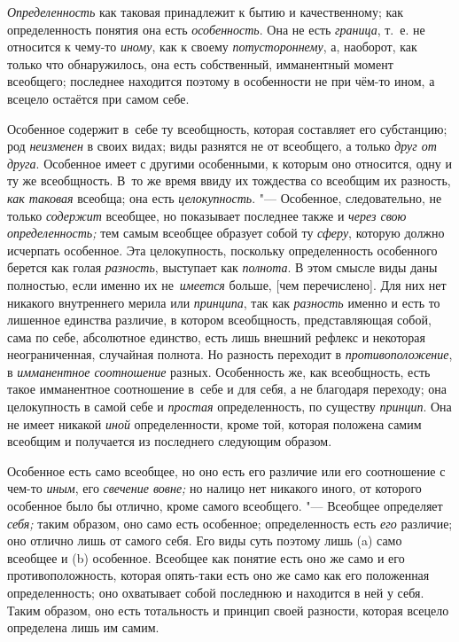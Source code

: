 {\em Определенность} как таковая принадлежит к бытию и качественному; как
определенность понятия она есть {\em особенность}. Она не есть {\em граница},
т.~е. не относится к чему-то {\em иному}, как к своему {\em потустороннему}, а,
наоборот, как только что обнаружилось, она есть собственный, имманентный момент
всеобщего; последнее находится поэтому в особенности не при чём-то ином, а
всецело остаётся при самом себе.

Особенное содержит в~себе ту всеобщность, которая составляет его субстанцию;
род {\em неизменен} в своих видах; виды разнятся не от всеобщего, а только
{\em друг от друга}. Особенное имеет с другими особенными, к которым оно
относится, одну и ту же всеобщность. В~то же время ввиду их тождества со
всеобщим их разность,
{\em как таковая} всеобща; она есть {\em целокупность}. "--- Особенное,
следовательно, не только {\em содержит} всеобщее, но показывает последнее
также и {\em через свою определенность;} тем самым всеобщее образует собой
ту {\em сферу}, которую должно исчерпать особенное. Эта целокупность, поскольку
определенность особенного берется как голая {\em разность}, выступает как
{\em полнота}. В этом смысле виды даны полностью, если именно их
не~{\em имеется} больше, [чем перечислено]. Для них нет никакого внутреннего
мерила или {\em принципа}, так как {\em разность} именно и есть то лишенное
единства различие, в котором всеобщность, представляющая собой, сама по себе,
абсолютное единство, есть лишь внешний рефлекс и некоторая неограниченная,
случайная полнота. Но разность переходит в {\em противоположение},
в {\em имманентное соотношение} разных. Особенность же, как всеобщность, есть
такое имманентное соотношение в~себе и для себя, а не благодаря переходу; она
целокупность в самой себе и {\em простая} определенность, по существу
{\em принцип}. Она не имеет никакой {\em иной} определенности, кроме той,
которая положена самим всеобщим и получается из последнего следующим образом.

Особенное есть само всеобщее, но оно есть его различие или его
соотношение с чем-то {\em иным}, его {\em свечение
вовне;} но налицо нет никакого иного, от которого особенное было бы отлично,
кроме самого всеобщего. "--- Всеобщее определяет {\em себя;} таким
образом, оно само есть особенное; определенность есть {\em его} различие; оно
отлично лишь от самого себя. Его виды суть поэтому лишь (a)
само всеобщее и (b) особенное. Всеобщее как понятие есть оно
же само и его противоположность, которая опять-таки есть оно же само как
его положенная определенность; оно охватывает собой последнюю и находится в
ней у себя. Таким образом, оно есть тотальность и принцип своей разности,
которая всецело определена лишь им самим.

